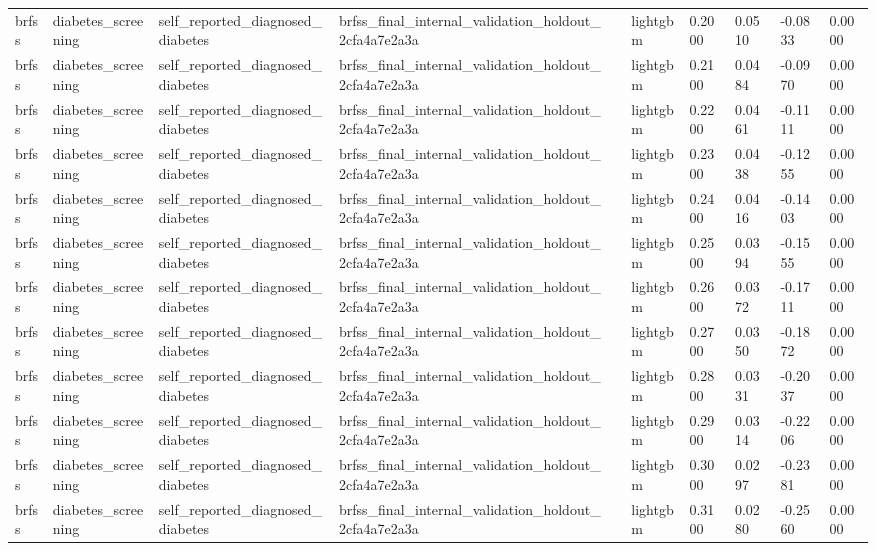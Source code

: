 \begin{tabular}{llllllllll}
brfss & diabetes\_screening & self\_reported\_diagnosed\_diabetes & brfss\_final\_internal\_validation\_holdout\_2cfa4a7e2a3a &  & lightgbm & 0.2000 & 0.0510 & -0.0833 & 0.0000 \\
brfss & diabetes\_screening & self\_reported\_diagnosed\_diabetes & brfss\_final\_internal\_validation\_holdout\_2cfa4a7e2a3a &  & lightgbm & 0.2100 & 0.0484 & -0.0970 & 0.0000 \\
brfss & diabetes\_screening & self\_reported\_diagnosed\_diabetes & brfss\_final\_internal\_validation\_holdout\_2cfa4a7e2a3a &  & lightgbm & 0.2200 & 0.0461 & -0.1111 & 0.0000 \\
brfss & diabetes\_screening & self\_reported\_diagnosed\_diabetes & brfss\_final\_internal\_validation\_holdout\_2cfa4a7e2a3a &  & lightgbm & 0.2300 & 0.0438 & -0.1255 & 0.0000 \\
brfss & diabetes\_screening & self\_reported\_diagnosed\_diabetes & brfss\_final\_internal\_validation\_holdout\_2cfa4a7e2a3a &  & lightgbm & 0.2400 & 0.0416 & -0.1403 & 0.0000 \\
brfss & diabetes\_screening & self\_reported\_diagnosed\_diabetes & brfss\_final\_internal\_validation\_holdout\_2cfa4a7e2a3a &  & lightgbm & 0.2500 & 0.0394 & -0.1555 & 0.0000 \\
brfss & diabetes\_screening & self\_reported\_diagnosed\_diabetes & brfss\_final\_internal\_validation\_holdout\_2cfa4a7e2a3a &  & lightgbm & 0.2600 & 0.0372 & -0.1711 & 0.0000 \\
brfss & diabetes\_screening & self\_reported\_diagnosed\_diabetes & brfss\_final\_internal\_validation\_holdout\_2cfa4a7e2a3a &  & lightgbm & 0.2700 & 0.0350 & -0.1872 & 0.0000 \\
brfss & diabetes\_screening & self\_reported\_diagnosed\_diabetes & brfss\_final\_internal\_validation\_holdout\_2cfa4a7e2a3a &  & lightgbm & 0.2800 & 0.0331 & -0.2037 & 0.0000 \\
brfss & diabetes\_screening & self\_reported\_diagnosed\_diabetes & brfss\_final\_internal\_validation\_holdout\_2cfa4a7e2a3a &  & lightgbm & 0.2900 & 0.0314 & -0.2206 & 0.0000 \\
brfss & diabetes\_screening & self\_reported\_diagnosed\_diabetes & brfss\_final\_internal\_validation\_holdout\_2cfa4a7e2a3a &  & lightgbm & 0.3000 & 0.0297 & -0.2381 & 0.0000 \\
brfss & diabetes\_screening & self\_reported\_diagnosed\_diabetes & brfss\_final\_internal\_validation\_holdout\_2cfa4a7e2a3a &  & lightgbm & 0.3100 & 0.0280 & -0.2560 & 0.0000 \\

\end{tabular}
